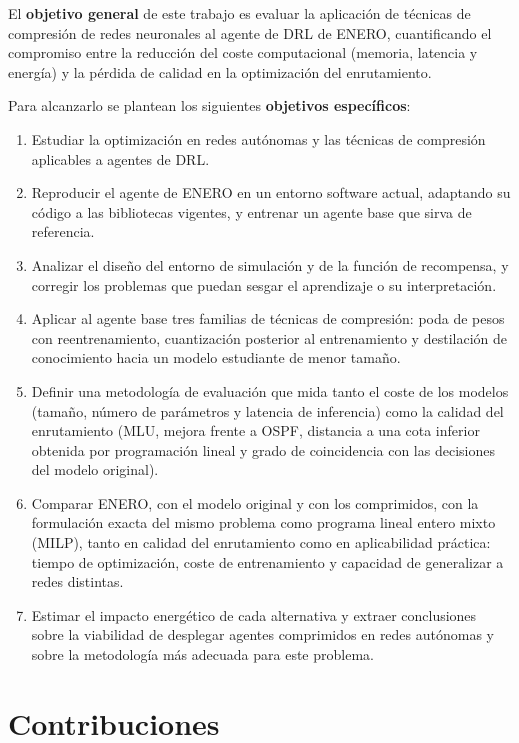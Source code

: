 El \textbf{objetivo general} de este trabajo es evaluar la aplicación de técnicas de compresión de redes neuronales al agente de DRL de ENERO, cuantificando el compromiso entre la reducción del coste computacional (memoria, latencia y energía) y la pérdida de calidad en la optimización del enrutamiento.

Para alcanzarlo se plantean los siguientes \textbf{objetivos específicos}:

\begin{enumerate}
	\item Estudiar la optimización en redes autónomas y las técnicas de compresión aplicables a agentes de DRL.
	\item Reproducir el agente de ENERO en un entorno software actual, adaptando su código a las bibliotecas vigentes, y entrenar un agente base que sirva de referencia.
	\item Analizar el diseño del entorno de simulación y de la función de recompensa, y corregir los problemas que puedan sesgar el aprendizaje o su interpretación.
	\item Aplicar al agente base tres familias de técnicas de compresión: poda de pesos con reentrenamiento, cuantización posterior al entrenamiento y destilación de conocimiento hacia un modelo estudiante de menor tamaño.
	\item Definir una metodología de evaluación que mida tanto el coste de los modelos (tamaño, número de parámetros y latencia de inferencia) como la calidad del enrutamiento (MLU, mejora frente a OSPF, distancia a una cota inferior obtenida por programación lineal y grado de coincidencia con las decisiones del modelo original).
	\item Comparar ENERO, con el modelo original y con los comprimidos, con la formulación exacta del mismo problema como programa lineal entero mixto (MILP), tanto en calidad del enrutamiento como en aplicabilidad práctica: tiempo de optimización, coste de entrenamiento y capacidad de generalizar a redes distintas.
	\item Estimar el impacto energético de cada alternativa y extraer conclusiones sobre la viabilidad de desplegar agentes comprimidos en redes autónomas y sobre la metodología más adecuada para este problema.
\end{enumerate}

\section{Contribuciones}\label{sec:int_contribuciones}

